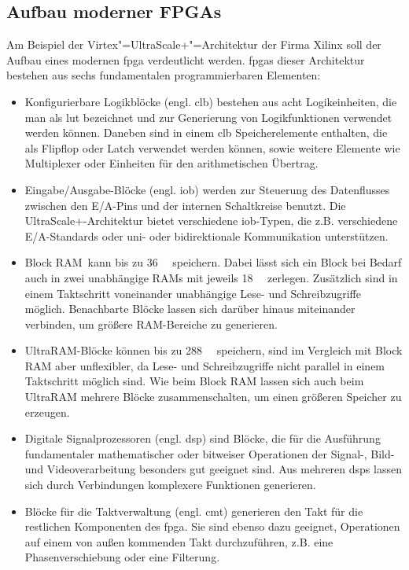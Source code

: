 \subsection{Aufbau moderner FPGAs}

Am Beispiel der Virtex"=UltraScale+"=Architektur der Firma Xilinx soll der
Aufbau eines modernen \gls{fpga} verdeutlicht werden. \gls{fpga}s dieser
Architektur bestehen aus sechs fundamentalen programmierbaren Elementen:
\begin{itemize}
    \item Konfigurierbare Logikblöcke (engl. \gls{clb}) bestehen aus acht
          Logikeinheiten, die man als \gls{lut} bezeichnet und zur
          Generierung von Logikfunktionen verwendet werden können. Daneben sind
          in einem \gls{clb} Speicherelemente enthalten, die als Flipflop oder
          Latch verwendet werden können, sowie weitere Elemente wie Multiplexer
          oder Einheiten für den arithmetischen Übertrag.
          \cite[vgl.][6]{ultrascaleclb2017}
    \item Eingabe/Ausgabe-Blöcke (engl. \gls{iob}) werden zur Steuerung des
          Datenflusses zwischen den E/A-Pins und der internen Schaltkreise
          benutzt. Die UltraScale+-Architektur bietet verschiedene
          \gls{iob}-Typen, die z.B. verschiedene E/A-Standards oder uni- oder
          bidirektionale Kommunikation unterstützen. \cite[vgl. die
          ausführliche E/A"=Beschreibung in][Kapitel 1 und 2]{ultrascaleio2019}
    \item \glqq Block RAM\grqq\ kann bis zu \SI{36}{\kilo\bit} speichern. Dabei
          lässt sich ein Block bei Bedarf auch in zwei unabhängige RAMs mit
          jeweils \SI{18}{\kilo\bit} zerlegen. Zusätzlich sind in einem
          Taktschritt voneinander unabhängige Lese- und Schreibzugriffe möglich.
          Benachbarte Blöcke lassen sich darüber hinaus miteinander verbinden,
          um größere RAM-Bereiche zu generieren.
          \cite[vgl.][6]{ultrascalemem2019}
    \item UltraRAM-Blöcke können bis zu \SI{288}{\kilo\bit} speichern, sind im
          Vergleich mit Block RAM aber unflexibler, da Lese- und Schreibzugriffe
          nicht parallel in einem Taktschritt möglich sind. Wie beim Block RAM
          lassen sich auch beim UltraRAM mehrere Blöcke zusammenschalten, um
          einen größeren Speicher zu erzeugen.
          \cite[vgl.][92--94]{ultrascalemem2019}
    \item Digitale Signalprozessoren (engl. \gls{dsp}) sind Blöcke, die für die
          Ausführung fundamentaler mathematischer oder bitweiser Operationen der
          Signal-, Bild- und Videoverarbeitung besonders gut geeignet sind. Aus
          mehreren \gls{dsp}s lassen sich durch Verbindungen komplexere
          Funktionen generieren. \cite[vgl.][7--8]{ultrascaledsp2019}
    \item Blöcke für die Taktverwaltung (engl. \gls{cmt}) generieren den Takt
          für die restlichen Komponenten des \gls{fpga}. Sie sind ebenso dazu
          geeignet, Operationen auf einem von außen kommenden Takt
          durchzuführen, z.B. eine Phasenverschiebung oder eine Filterung.
          \cite[vgl.][35--40]{ultrascaleclock2018}
\end{itemize}
